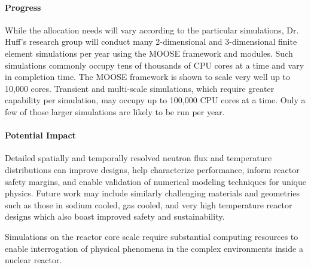 \documentclass[11pt]{article}
\begin{document}
\paragraph{Progress}


While the allocation needs will vary according to the particular simulations, Dr. Huff’s research group will conduct many 2-dimensional and 3-dimensional finite element simulations per year using the MOOSE framework and modules. Such simulations commonly occupy tens of thousands of CPU cores at a time and vary in completion time. The MOOSE framework is shown to scale very well up to 10,000 cores. Transient and multi-scale simulations, which require greater capability per simulation, may occupy up to 100,000 CPU cores at a time. Only a few of those larger simulations are likely to be run per year.

\paragraph{Potential Impact}
Detailed spatially and temporally resolved neutron flux and
temperature distributions can improve designs, help characterize
performance, inform reactor safety margins, and enable validation of numerical
modeling techniques for unique physics.
Future work may include similarly challenging materials and geometries such as
those in sodium cooled, gas cooled, and very high temperature reactor designs
which also boast improved safety and sustainability.


Simulations on the reactor core scale require substantial
computing resources to enable interrogation of
physical phenomena in the complex environments inside a nuclear reactor.
\end{document}
